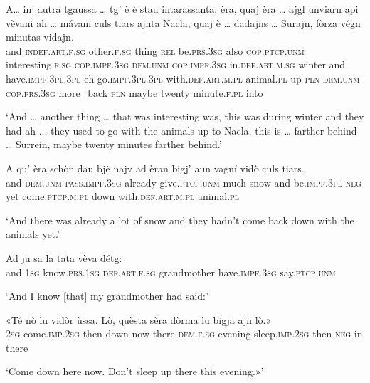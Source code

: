 \begin{linenumbers}
\gll  A… in’ autra tgaussa … tg' è è stau\footnotemark{} intarassanta, èra, quaj èra … ajgl unviarn api vèvani ah … mávani culs tiars ajnta Nacla, quaj è …  dadajns … Surajn, fòrza végn minutas vidajn.    \\
and \textsc{indef.art.f.sg} other.\textsc{f.sg} thing {} \textsc{rel} be.\textsc{prs.3sg} also \textsc{cop.ptcp.unm} interesting.\textsc{f.sg} \textsc{cop.impf.3sg} \textsc{dem.unm} \textsc{cop.impf.3sg} {}  in.\textsc{def.art.m.sg} winter and have.\textsc{impf.3pl.3pl} eh {} go.\textsc{impf.3pl.3pl} with.\textsc{def.art.m.pl} animal.\textsc{pl} up \textsc{pln} \textsc{dem.unm} \textsc{cop.prs.3sg} {} more\_back {} \textsc{pln} maybe twenty minute.\textsc{f.pl} into\\
\end{linenumbers}
\medskip
\glt `And … another thing … that was interesting was, this was during winter and they had ah ... they used to go with the animals up to Nacla, this is … farther behind … Surrein, maybe twenty minutes farther behind.'
\medskip

\begin{linenumbers}
\gll A qu' èra schòn dau bjè najv ad èran bigj’ aun vagní vidò culs tiars.\\  
and \textsc{dem.unm} \textsc{pass.impf.3sg} already give.\textsc{ptcp.unm} much snow and be.\textsc{impf.3pl} \textsc{neg} yet come.\textsc{ptcp.m.pl} down with.\textsc{def.art.m.pl} animal.\textsc{pl} \\
 \end{linenumbers}
\medskip
\glt `And there was already a lot of snow and they hadn’t come back down with the animals yet.'
\medskip

\begin{linenumbers}
\gll  Ad ju sa la tata vèva détg:   \\
 and \textsc{1sg} know.\textsc{prs.1sg} \textsc{def.art.f.sg} grandmother have.\textsc{impf.3sg} say.\textsc{ptcp.unm}\\
\end{linenumbers}
\medskip
\glt `And I know [that] my grandmother had said:'
\medskip

\begin{linenumbers}
\gll «Té nò lu vidòr ùssa. Lò, quèsta sèra dòrma lu bigja ajn lò.»\\
 \textsc{2sg} come.\textsc{imp.2sg} then down now there  \textsc{dem.f.sg} evening sleep.\textsc{imp.2sg} then \textsc{neg} in there\\
\end{linenumbers}
\medskip
\glt `Come down here now. Don’t sleep up there this evening.»'
\medskip

